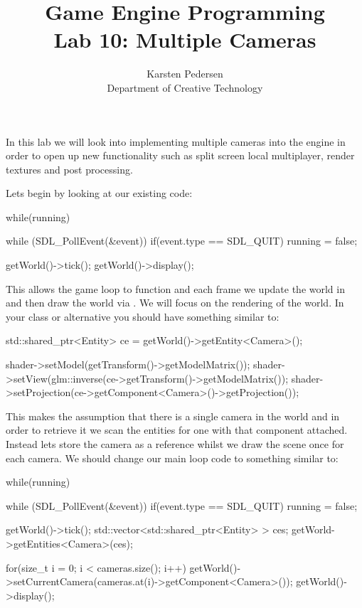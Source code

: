 \documentclass[10pt]{article}
\begin{document}
\title{Game Engine Programming \\
  \large Lab 10: Multiple Cameras}

\author{Karsten Pedersen\\ Department of Creative Technology}
\maketitle

In this lab we will look into implementing multiple cameras into the engine
in order to open up new functionality such as split screen local multiplayer,
render textures and post processing.

Lets begin by looking at our existing code:

\begin{Code}

while(running)
{
  while (SDL_PollEvent(&event))
  {
    if(event.type == SDL_QUIT)
    {
      running = false;
    }
  }

  getWorld()->tick();
  getWorld()->display();
}

\end{Code}

This allows the game loop to function and each frame we update the world in
 and then draw the world via . We will focus on
the rendering of the world. In your  class or alternative
you should have something similar to:

\begin{Code}

std::shared_ptr<Entity> ce = getWorld()->getEntity<Camera>();

shader->setModel(getTransform()->getModelMatrix());
shader->setView(glm::inverse(ce->getTransform()->getModelMatrix());
shader->setProjection(ce->getComponent<Camera>()->getProjection());

\end{Code}

This makes the assumption that there is a single camera in the world and
in order to retrieve it we scan the entities for one with that component
attached. Instead lets store the  camera as a reference
whilst we draw the scene once for each camera. We should change our main loop
code to something similar to:

\begin{Code}

while(running)
{
  while (SDL_PollEvent(&event))
  {
    if(event.type == SDL_QUIT)
    {
      running = false;
    }
  }

  getWorld()->tick();
  std::vector<std::shared_ptr<Entity> > ces;
  getWorld->getEntities<Camera>(ces);

  for(size_t i = 0; i < cameras.size(); i++)
  {
    getWorld()->setCurrentCamera(cameras.at(i)->getComponent<Camera>());
    getWorld()->display();
  }
}

\end{Code}
\end{document}
